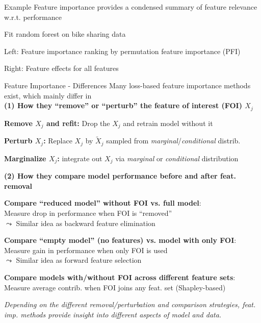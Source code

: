 \documentclass[10pt,compress,t,notes=noshow, xcolor=table]{beamer}
\begin{document}
\begin{framev}[align=top]{Example}
Feature importance provides a condensed summary of feature relevance \\
w.r.t. performance \\
\spacer[0.25]
\begin{itemizeM}
\item Fit random forest on bike sharing data
\item Left: Feature importance ranking by permutation feature importance (PFI)
\item Right: Feature effects for all features
\end{itemizeM}
\spacer[0.25]
\end{framev}


\begin{framev}[align=top]{Feature Importance - Differences }
Many loss-based feature importance methods exist, which mainly differ in \\
\spacer[0.25]
\textbf{(1) How they ``remove'' or ``perturb'' the feature of interest (FOI) $X_j$}
\begin{itemizeM}
\item \textbf{Remove $X_j$ and refit:} Drop the $X_j$ and retrain model without it %
\item \textbf{Perturb $X_j$:} Replace $X_j$ by $\tilde X_j$ sampled from \textit{marginal}/\textit{conditional} distrib. %
\item \textbf{Marginalize $X_j$:} integrate out $X_j$ via \textit{marginal} or \textit{conditional} distribution %
\end{itemizeM}
\pause
\spacer[0.25]
\textbf{(2) How they compare model performance before and after feat. removal}
\begin{itemizeM}
\item \textbf{Compare ``reduced model'' without FOI vs. full model}: \\
Measure drop in performance when FOI is ``removed'' \\
$\leadsto$ Similar idea as backward feature elimination  %
\item \textbf{Compare ``empty model'' (no features) vs. model with only FOI}: \\
Measure gain in performance when only FOI is used \\
$\leadsto$ Similar idea as forward feature selection %
\item \textbf{Compare models with/without FOI across different feature sets}: \\
Measure average contrib. when FOI joins any feat. set (Shapley-based) %
\end{itemizeM}
\pause
\spacer[0.25]
\textit{Depending on the different removal/perturbation and comparison strategies, feat. imp. methods provide insight into different aspects of model and data.}
\end{framev}
\end{document}
